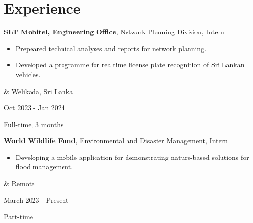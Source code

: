 \documentclass[10pt, a4paper]{article}
\newenvironment{highlights}{
        \begin{itemize}[
                topsep=0pt,
                parsep=0.10 cm,
                partopsep=0pt,
                itemsep=0pt,
                after=\vspace{-1\baselineskip},
                leftmargin=0.4 cm + 3pt
            ]
    }{
        \end{itemize}
    } %
\let\originalTabularx\tabularx
\let\originalEndTabularx\endtabularx
\renewenvironment{tabularx}{\bgroup\centering\originalTabularx}{\originalEndTabularx\par\egroup}
\begin{document}
\vspace{0.2 cm}
    \section{Experience}

        \begin{tabularx}{
            \textwidth-0.4 cm-0.13cm
        }{
            K{0.2 cm}
            R{4.1 cm}
        }
            \textbf{SLT Mobitel, Engineering Office}, Network Planning Division, Intern

            \vspace{0.10 cm}

            \begin{highlights}
	           \item Prepeared technical analyses and reports for network planning.
                \item Developed a programme for realtime license plate recognition of Sri Lankan vehicles.
            \end{highlights}
            &
            Welikada, Sri Lanka

            Oct 2023 - Jan 2024

            Full-time, 3 months
        \end{tabularx}
        
        \begin{tabularx}{
            \textwidth-0.4 cm-0.13cm
        }{
            K{0.2 cm}
            R{4.1 cm}
        }
            \textbf{World Wildlife Fund}, Environmental and Disaster Management, Intern

            \vspace{0.10 cm}

            \begin{highlights}
                \item Developing a mobile application for demonstrating nature-based solutions for flood management.
            \end{highlights}
            &
            Remote

            March 2023 - Present
            
            Part-time
        \end{tabularx}


%
%
%
%
    
\end{document}
